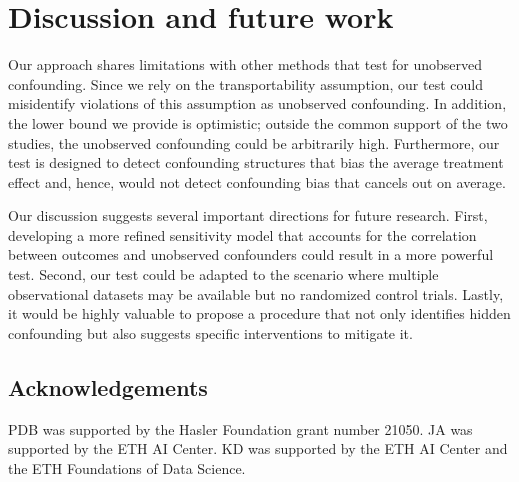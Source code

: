 \section{Discussion and future work}
\label{sec:limitations}
Our approach shares limitations with other methods that test for unobserved confounding. Since we rely on the transportability assumption, our test could misidentify violations of this assumption as unobserved confounding. 
In addition, the lower bound we provide is optimistic; outside the common support of the two studies, the unobserved confounding could be arbitrarily high. Furthermore, our test is designed to detect confounding structures that bias the average treatment effect and, hence, would not detect confounding bias that cancels out on average.



Our discussion suggests several important directions for future research. 
First, 
developing a more refined sensitivity model that accounts for the correlation between outcomes and unobserved confounders could result in a more powerful test. Second, our test could be adapted to the scenario where multiple observational datasets may be available but no randomized control trials. Lastly, it would be highly valuable to propose a procedure that not only identifies hidden confounding but also suggests specific interventions to mitigate it. 

\subsection*{Acknowledgements}
PDB was supported by 
the Hasler Foundation grant number 21050. JA was supported by the ETH AI Center. KD was supported by the ETH AI Center and the ETH Foundations of Data Science.


